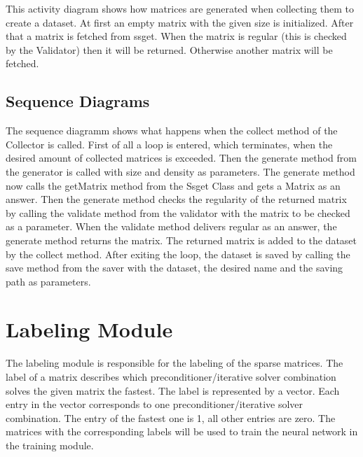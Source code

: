 \documentclass[parskip=full]{scrartcl}
\begin{document}
This activity diagram shows how matrices are generated when collecting them to create a dataset.
At first an empty matrix with the given size is initialized.
After that a matrix is fetched from ssget. When the matrix is regular (this is checked by the Validator) then it will be returned.
Otherwise another matrix will be fetched.

\subsection{Sequence Diagrams}

The sequence diagramm shows what happens when the collect method of the Collector is called. First of all a loop is entered, which terminates, when the desired amount of collected matrices is exceeded. Then the generate method from the generator is called with size and density as parameters. The generate method now calls the getMatrix method from the Ssget Class and gets a Matrix as an answer. Then the generate method checks the regularity of the returned matrix by calling the validate method from the validator with the matrix to be checked as a parameter. When the validate method delivers  regular as an answer, the generate method returns the matrix. The returned matrix is added to the dataset by the collect method. After exiting the loop, the dataset is saved by calling the save method from the saver with the dataset, the desired name and the saving path as parameters.


\newpage
\begin{figure}[h]
\begin{center}

\label{Sequence Diagram}
\end{center}
\end{figure}
\newpage


\section{Labeling Module}
The labeling module is responsible for the labeling of the sparse matrices.
The \gls{label} of a matrix describes which \gls{preconditioner}/\gls{iterative solver} combination solves the given matrix the fastest.
The \gls{label} is represented by a vector.
Each entry in the vector corresponds to one \gls{preconditioner}/\gls{iterative solver} combination.
The entry of the fastest one is 1, all other entries are zero.
The matrices with the corresponding \glspl{label} will be used to train the \gls{neural network} in the training module.
\end{document}
